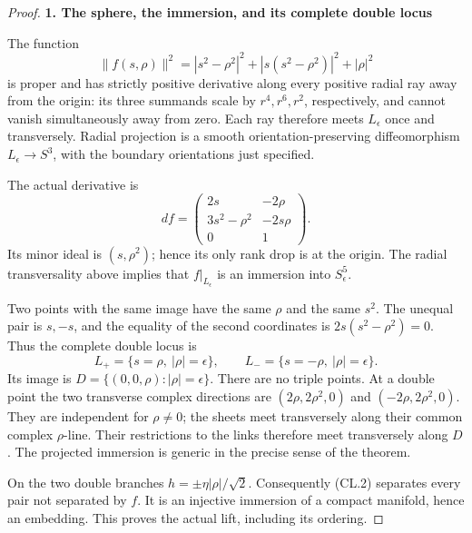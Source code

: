 \begin{proof}
\par

\medskip\noindent\textbf{1. The sphere, the immersion, and its complete double locus}

\par\nobreak

The function
\[
 \|f(s,\rho)\|^2
   =|s^2-\rho^2|^2+|s(s^2-\rho^2)|^2+|\rho|^2
\]
is proper and has strictly positive derivative along every positive radial
ray away from the origin: its three summands scale by \(r^4,r^6,r^2\),
respectively, and cannot vanish simultaneously away from zero. Each ray
therefore meets \(L_\epsilon\) once and transversely. Radial projection
is a smooth orientation-preserving diffeomorphism
\(L_\epsilon\to S^3\), with the boundary orientations just specified.

The actual derivative is
\[
 df=\begin{pmatrix}
       2s&-2\rho\\
       3s^2-\rho^2&-2s\rho\\
       0&1
     \end{pmatrix}.                                               \tag{CL.3}
\]
Its minor ideal is \((s,\rho^2)\); hence its only rank drop is at the
origin. The radial transversality above implies that
\(f|_{L_\epsilon}\) is an immersion into \(S^5_\epsilon\).

Two points with the same image have the same \(\rho\) and the same
\(s^2\). The unequal pair is \(s,-s\), and the equality of the second
coordinates is \(2s(s^2-\rho^2)=0\). Thus the complete double locus is
\[
 L_+=\{s=\rho,\ |\rho|=\epsilon\},\qquad
 L_-=\{s=-\rho,\ |\rho|=\epsilon\}.                                \tag{CL.4}
\]
Its image is \(D=\{(0,0,\rho):|\rho|=\epsilon\}\).
There are no triple points. At a double point the two transverse complex
directions are \((2\rho,2\rho^2,0)\) and
\((-2\rho,2\rho^2,0)\). They are independent for \(\rho\ne0\);
the sheets meet transversely along their common complex \(\rho\)-line.
Their restrictions to the links therefore meet transversely along \(D\).
The projected immersion is generic in the precise sense of the theorem.

On the two double branches \(h=\pm\eta|\rho|/\sqrt2\).
Consequently (CL.2) separates every pair not separated by \(f\).
It is an injective immersion of a compact manifold, hence an embedding.
This proves the actual lift, including its ordering.

\par


\end{proof}
